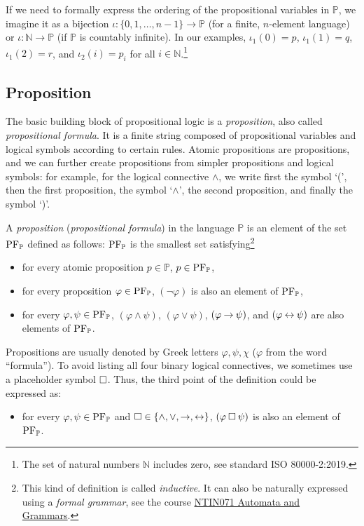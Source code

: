 \begin{remark}\label{remark:order-of-language}
If we need to formally express the ordering of the propositional variables in $\mathbb{P}$, we imagine it as a bijection $\iota\colon\{0, 1, \dots, n-1\}\to \mathbb{P}$ (for a finite, $n$-element language) or $\iota\colon\mathbb{N}\to \mathbb{P}$ (if $\mathbb{P}$ is countably infinite). In our examples, $\iota_1(0)=p$, $\iota_1(1)=q$, $\iota_1(2)=r$, and $\iota_2(i)=p_i$ for all $i\in\mathbb{N}$.\footnote{The set of natural numbers $\mathbb{N}$ includes zero, see standard ISO 80000-2:2019.}
\end{remark}

\subsection{Proposition}

The basic building block of propositional logic is a \emph{proposition}, also called \emph{propositional formula}. It is a finite string composed of propositional variables and logical symbols according to certain rules. Atomic propositions are propositions, and we can further create propositions from simpler propositions and logical symbols: for example, for the logical connective $\land$, we write first the symbol `(', then the first proposition, the symbol `$\land$', the second proposition, and finally the symbol `)'.
\begin{definition}[Proposition]\label{definition:proposition}
    A \emph{proposition} (\emph{propositional formula}) in the language $\mathbb{P}$ is an element of the set $\operatorname{PF}_\mathbb{P}$ defined as follows: $\operatorname{PF}_\mathbb{P}$ is the smallest set satisfying\footnote{This kind of definition is called \emph{inductive}. It can also be naturally expressed using a \emph{formal grammar}, see the course \href{https://is.cuni.cz/studium/predmety/index.php?do=predmet&kod=NTIN071}{NTIN071 Automata and Grammars}.}
    \begin{itemize}
        \item for every atomic proposition $p\in\mathbb{P}$, $p\in\operatorname{PF}_\mathbb{P}$,
        \item for every proposition $\varphi\in\operatorname{PF}_\mathbb{P}$, $(\neg\varphi)$ is also an element of $\operatorname{PF}_\mathbb{P}$,
        \item for every $\varphi,\psi\in\operatorname{PF}_\mathbb{P}$, $(\varphi\land\psi)$, $(\varphi\lor\psi)$, $(\varphi\mathbin{\rightarrow}\psi)$, and $(\varphi\mathbin{\leftrightarrow}\psi)$ are also elements of $\operatorname{PF}_\mathbb{P}$.
    \end{itemize}        
\end{definition}
Propositions are usually denoted by Greek letters $\varphi, \psi, \chi$ ($\varphi$ from the word ``formula''). To avoid listing all four binary logical connectives, we sometimes use a placeholder symbol ${\mathbin{\square}}$. Thus, the third point of the definition could be expressed as:
\begin{itemize}
    \item for every $\varphi,\psi\in\operatorname{PF}_\mathbb{P}$ and ${\mathbin{\square}}\in\{\land, \lor, \mathbin{\rightarrow}, \mathbin{\leftrightarrow}\}$, $(\varphi\mathbin{\square}\psi)$ is also an element of $\operatorname{PF}_\mathbb{P}$.
\end{itemize}  


